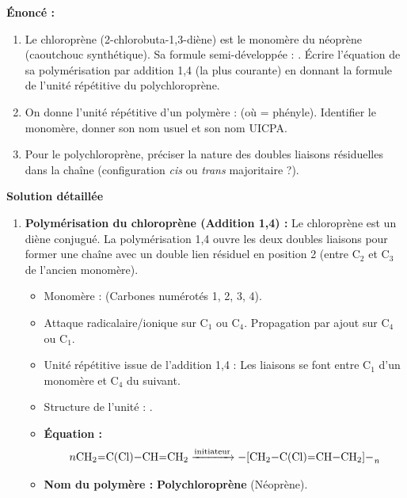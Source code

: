 \documentclass[11pt]{article}
\begin{document}
\begin{exoresolu}
\textbf{Énoncé :}
\begin{enumerate}
    \item Le chloroprène (2-chlorobuta-1,3-diène) est le monomère du néoprène (caoutchouc synthétique). Sa formule semi-développée : .
        Écrire l'équation de sa polymérisation par addition 1,4 (la plus courante) en donnant la formule de l'unité répétitive du polychloroprène.
    \item On donne l'unité répétitive d'un polymère :  (où  = phényle).
        Identifier le monomère, donner son nom usuel et son nom UICPA.
    \item Pour le polychloroprène, préciser la nature des doubles liaisons résiduelles dans la chaîne (configuration \textit{cis} ou \textit{trans} majoritaire ?).
\end{enumerate}

\tcblower
\textbf{Solution détaillée}

\begin{enumerate}
    \item \textbf{Polymérisation du chloroprène (Addition 1,4) :}
    Le chloroprène est un diène conjugué. La polymérisation 1,4 ouvre les deux doubles liaisons pour former une chaîne avec un double lien résiduel en position 2 (entre C$_2$ et C$_3$ de l'ancien monomère).
    \begin{itemize}
        \item Monomère :  (Carbones numérotés 1, 2, 3, 4).
        \item Attaque radicalaire/ionique sur C$_1$ ou C$_4$. Propagation par ajout sur C$_4$ ou C$_1$.
        \item Unité répétitive issue de l'addition 1,4 : Les liaisons se font entre C$_1$ d'un monomère et C$_4$ du suivant.
        \item Structure de l'unité : .
        \item \textbf{Équation :}
        \[ n \ce{CH2=C(Cl)-CH=CH2} \xrightarrow{\text{initiateur}} \ce{-[CH2-C(Cl)=CH-CH2]-_n} \]
        \item \textbf{Nom du polymère :} \textbf{Polychloroprène} (Néoprène).
    \end{itemize}


\end{enumerate}
\end{exoresolu}
\end{document}
